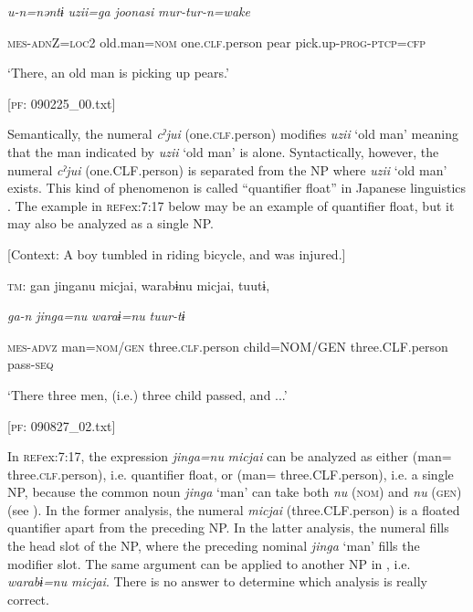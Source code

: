     \textit{u-n=nəntɨ}  \textit{uzii=ga}  \textit{}  \textit{joonasi} \textit{mur-tur-n=wake}
                                                                           
    \textsc{mes}-\textsc{adn}Z=\textsc{loc}2  old.man=\textsc{nom}  one.\textsc{clf}.person  pear  pick.up-\textsc{prog}-\textsc{ptcp}=\textsc{cfp}

    ‘There, an old man is picking up pears.’

    [\textsc{pf}: 090225\_00.txt]
\z

Semantically, the numeral \textit{cˀjui} (one.\textsc{clf}.person) modifies \textit{uzii} ‘old man’ meaning that the man indicated by \textit{uzii} ‘old man’ is alone. Syntactically, however, the numeral \textit{cˀjui} (one.CLF.person) is separated from the NP where \textit{uzii} ‘old man’ exists. This kind of phenomenon is called “quantifier float” in Japanese linguistics \citep[286]{Shibatani1990}. The example in \textsc{ref}{ex:7:17} below may be an example of quantifier float, but it may also be analyzed as a single NP.

\ea \label{ex:7:17}  [Context: A boy tumbled in riding bicycle, and was injured.]

  \textsc{tm}:  gan  jinganu  micjai,  warabɨnu  micjai,  tuutɨ,

    \textit{ga-n}  \textit{jinga=nu}  \textit{}  \textit{waraɨ=nu} \textit{}  \textit{tuur-tɨ}
                                                                         
    \textsc{mes}-\textsc{advz}  man=\textsc{nom}/\textsc{gen}  three.\textsc{clf}.person  child=NOM/GEN   three.CLF.person  pass-\textsc{seq}

    ‘There three men, (i.e.) three child passed, and ...’

    [\textsc{pf}: 090827\_02.txt]
\z

In \textsc{ref}{ex:7:17}, the expression \textit{jinga=nu} \textit{micjai} can be analyzed as either (man= three.\textsc{clf}.person), i.e. quantifier float, or (man= three.CLF.person), i.e. a single NP, because the common noun \textit{jinga} ‘man’ can take both \textit{nu} (\textsc{nom}) and \textit{nu} (\textsc{gen}) (see ). In the former analysis, the numeral \textit{micjai} (three.CLF.person) is a floated quantifier apart from the preceding NP. In the latter analysis, the numeral fills the head slot of the NP, where the preceding nominal \textit{jinga} ‘man’ fills the modifier slot. The same argument can be applied to another NP in , i.e. \textit{warabɨ=nu} \textit{micjai}. There is no answer to determine which analysis is really correct.

